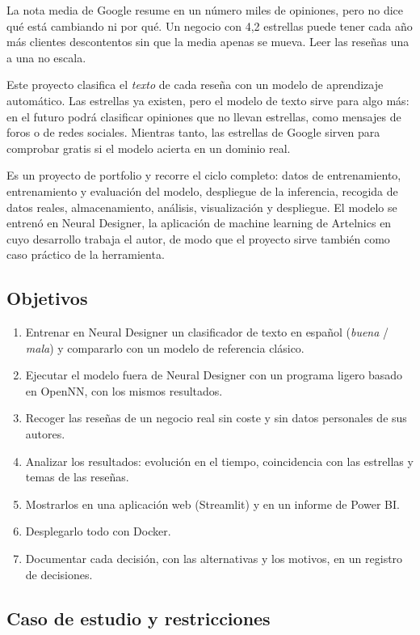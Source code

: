 \documentclass[11pt,a4paper]{article}
\begin{document}
La nota media de Google resume en un número miles de opiniones, pero no dice qué está cambiando ni por qué. Un
negocio con 4,2 estrellas puede tener cada año más clientes descontentos sin que la media apenas se mueva. Leer las
reseñas una a una no escala.

Este proyecto clasifica el \emph{texto} de cada reseña con un modelo de aprendizaje automático. Las estrellas ya
existen, pero el modelo de texto sirve para algo más: en el futuro podrá clasificar opiniones que no llevan
estrellas, como mensajes de foros o de redes sociales. Mientras tanto, las estrellas de Google sirven para
comprobar gratis si el modelo acierta en un dominio real.

Es un proyecto de portfolio y recorre el ciclo completo: datos de entrenamiento, entrenamiento y evaluación del
modelo, despliegue de la inferencia, recogida de datos reales, almacenamiento, análisis, visualización y
despliegue. El modelo se entrenó en Neural Designer, la aplicación de machine learning de Artelnics en cuyo
desarrollo trabaja el autor, de modo que el proyecto sirve también como caso práctico de la herramienta.

\subsection{Objetivos}

\begin{enumerate}
  \item Entrenar en Neural Designer un clasificador de texto en español (\emph{buena} / \emph{mala}) y compararlo
        con un modelo de referencia clásico.
  \item Ejecutar el modelo fuera de Neural Designer con un programa ligero basado en OpenNN, con los mismos
        resultados.
  \item Recoger las reseñas de un negocio real sin coste y sin datos personales de sus autores.
  \item Analizar los resultados: evolución en el tiempo, coincidencia con las estrellas y temas de las reseñas.
  \item Mostrarlos en una aplicación web (Streamlit) y en un informe de Power BI.
  \item Desplegarlo todo con Docker.
  \item Documentar cada decisión, con las alternativas y los motivos, en un registro de decisiones.
\end{enumerate}

\subsection{Caso de estudio y restricciones}
\end{document}
